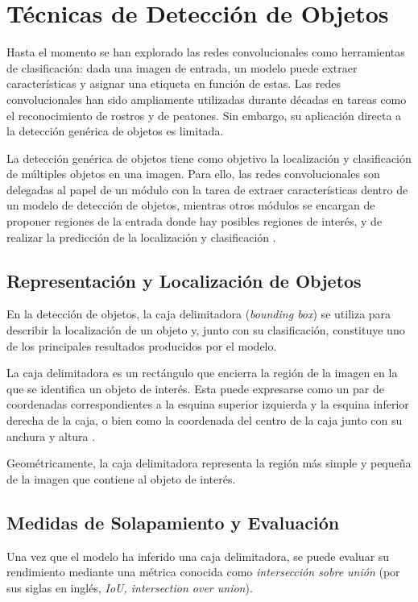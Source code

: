 \section{Técnicas de Detección de Objetos}
Hasta el momento se han explorado las redes convolucionales como herramientas de clasificación:
dada una imagen de entrada, un modelo puede extraer características y asignar una etiqueta en
función de estas. Las redes convolucionales han sido ampliamente utilizadas durante décadas
en tareas como el reconocimiento de rostros y de peatones. Sin embargo, su aplicación directa
a la detección genérica de objetos es limitada.
\medskip

La detección genérica de objetos tiene como objetivo la localización y clasificación de múltiples
objetos en una imagen. Para ello, las redes convolucionales son delegadas al papel de un módulo con la
tarea de extraer características dentro de un modelo de detección de objetos, mientras otros 
módulos se encargan de proponer regiones de la entrada donde hay posibles regiones de 
interés, y de realizar la predicción de la localización y clasificación \parencite{zhao2019object}.

\subsection{Representación y Localización de Objetos}
En la detección de objetos, la caja delimitadora (\textit{bounding box}) se utiliza para describir la
localización de un objeto y, junto con su clasificación, constituye uno de los principales resultados
producidos por el modelo. 
\medskip

La caja delimitadora es un rectángulo que encierra la región de la imagen en la que se identifica un
objeto de interés. Esta puede expresarse como un par de coordenadas correspondientes a la esquina
superior izquierda y la esquina inferior derecha de la caja, o bien como la coordenada del centro de
la caja junto con su anchura y altura \parencite[p.630]{zhang2023dive}.
\medskip

Geométricamente, la caja delimitadora representa la región más simple y pequeña de la imagen que 
contiene al objeto de interés.

\subsection{Medidas de Solapamiento y Evaluación}
Una vez que el modelo ha inferido una caja delimitadora, se puede evaluar su rendimiento mediante una métrica conocida como \textit{intersección sobre unión} (por sus siglas en inglés, \textit{IoU, intersection over union}).
\medskip

